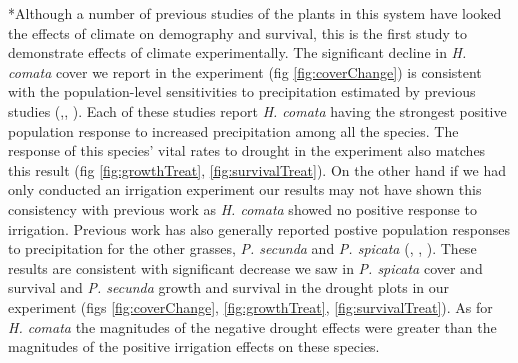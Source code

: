 \documentclass[11pt]{article}
\begin{document}
\begin{doublespacing}
*Although a number of previous studies of the plants in this system have looked the effects of climate on demography and survival, this is the first study to demonstrate effects of climate experimentally. The significant decline in \textit{H. comata} cover we report in the experiment (fig \ref{fig:coverChange}) is consistent with the population-level sensitivities to precipitation estimated by previous studies (\citep{chu_direct_2016},\citep{dalgleish_climate_2010}, \citep{adler_forecasting_2012}). Each of these studies report \textit{H. comata} having the strongest positive population response to increased precipitation among all the species. The response of this species' vital rates to drought in the experiment also matches this result (fig \ref{fig:growthTreat}, \ref{fig:survivalTreat}). On the other hand if we had only conducted an irrigation experiment our results may not have shown this consistency with previous work as \textit{H. comata} showed no positive response to irrigation. Previous work has also generally reported postive population responses to precipitation for the other grasses, \textit{P. secunda} and \textit{P. spicata} (\citep{adler_forecasting_2012}, \citep{chu_direct_2016}, \citep{dalgleish_climate_2010}). These results are consistent with significant decrease we saw in \textit{P. spicata} cover and survival and \textit{P. secunda} growth and survival in the drought plots in our experiment (figs \ref{fig:coverChange}, \ref{fig:growthTreat}, \ref{fig:survivalTreat}). As for \textit{H. comata} the magnitudes of the negative drought effects were greater than the magnitudes of the positive irrigation effects on these species. 


\end{doublespacing}
\end{document}
